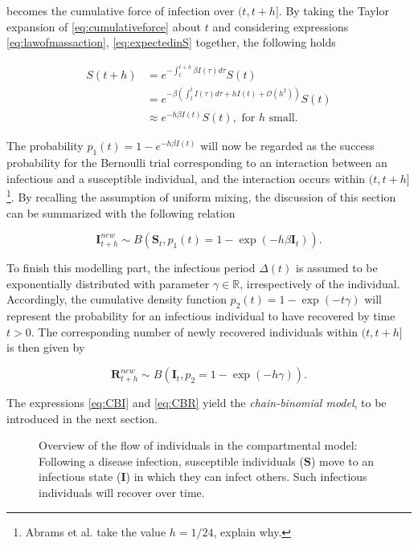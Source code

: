 \documentclass[a4paper,preprint]{elsarticle}
\renewcommand{\vec}[1]{\boldsymbol{#1}}
\begin{document}
becomes the cumulative force of infection over $(t,t+h]$. By taking the Taylor expansion of \eqref{eq:cumulativeforce} about $t$ and considering expressions \eqref{eq:lawofmassaction}, \eqref{eq:expectedinS} together, the following holds

\begin{align*} 
\label{eq:expectedinS}
        S(t+h)&=e^{-\int_{t}^{t+h} \beta I(\tau)d\tau}S(t)\\
        &=e^{-\beta(\int_{t}^{t}I(\tau)d\tau+hI(t)+\mathcal{O}( h^2))}S(t)\\
        &\approx e^{-h\beta I(t)}S(t),\text{ for $h$ small.}   
\end{align*}

The probability $p_1(t)=1-e^{-h\beta I(t)}$ will now be regarded as the success probability  for the Bernoulli trial corresponding to an interaction between an infectious and a susceptible individual, and the interaction occurs within $(t,t+h]$\footnote{Abrams et al. \cite{abrams21} take the value $h=1/24$, explain why.}. By recalling the assumption of uniform mixing, the discussion of this section can be summarized with the following relation

\begin{equation}
\label{eq:CBI}
\vec{I}_{t+h}^{new}\sim B(\vec{S}_t, p_1(t)=1-\exp(-h\beta \vec{I}_t)).
\end{equation}

To finish this modelling part, the infectious period $\Delta(t)$ is assumed to be exponentially distributed with parameter $\gamma \in \mathbb{R}$, irrespectively of the individual. Accordingly, the cumulative density function $p_2(t)=1-\exp(-t\gamma)$ will represent the probability for an infectious individual to have recovered by time $t>0$. The corresponding number of newly recovered individuals within $(t,t+h]$ is then given by

\begin{equation} 
    \label{eq:CBR}
    \vec{R}_{t+h}^{new}\sim B(\vec{I}_t, p_2=1-\exp(-h\gamma)).
\end{equation}

The expressions \eqref{eq:CBI} and \eqref{eq:CBR} yield the \textit{chain-binomial model}, to be introduced in the next section.


\begin{figure}[t]
  \centering
\caption{Overview of the flow of individuals in the compartmental model:
Following a disease infection, susceptible individuals ($\vec{S}$) move to an
infectious state ($\vec{I}$) in which they can infect others. Such infectious
individuals will recover over time.}
\label{fig:flow_diagram}
\end{figure}
\end{document}
